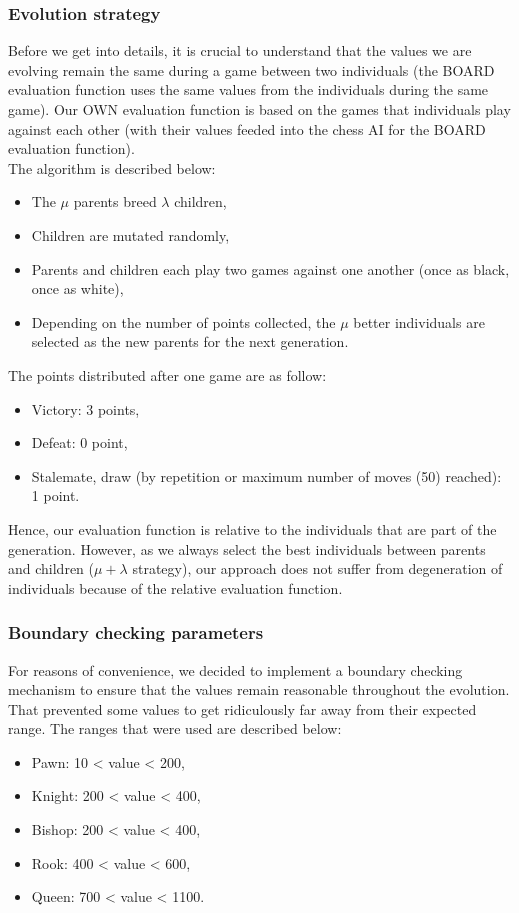 \documentclass[a4paper,12pt,twocolumn]{article}
\begin{document}
\subsubsection{Evolution strategy}
Before we get into details, it is crucial to understand that the values we are evolving remain the same during a game between two individuals (the BOARD evaluation function uses the same values from the individuals during the same game). Our OWN evaluation function is based on the games that individuals play against each other (with their values feeded into the chess AI for the BOARD evaluation function).\\
The algorithm is described below:
\begin{itemize}
\item The $\mu$ parents breed $\lambda$ children,
\item Children are mutated randomly,
\item Parents and children each play two games against one another (once as black, once as white),
\item Depending on the number of points collected, the $\mu$ better individuals are selected as the new parents for the next generation.
\end{itemize}
The points distributed after one game are as follow:
\begin{itemize}
\item Victory: 3 points,
\item Defeat: 0 point,
\item Stalemate, draw (by repetition or maximum number of moves (50) reached): 1 point.
\end{itemize}
Hence, our evaluation function is relative to the individuals that are part of the generation. However, as we always select the best individuals between parents and children ($\mu + \lambda$ strategy), our approach does not suffer from degeneration of individuals because of the relative evaluation function.

\subsubsection{Boundary checking parameters}
For reasons of convenience, we decided to implement a boundary checking mechanism to ensure that the values remain reasonable throughout the evolution. That prevented some values to get ridiculously far away from their expected range. The ranges that were used are described below:
\begin{itemize}
\item Pawn: 10 < value < 200,
\item Knight: 200 < value < 400,
\item Bishop: 200 < value < 400,
\item Rook: 400 < value < 600,
\item Queen: 700 < value < 1100.
\end{itemize}
\end{document}
